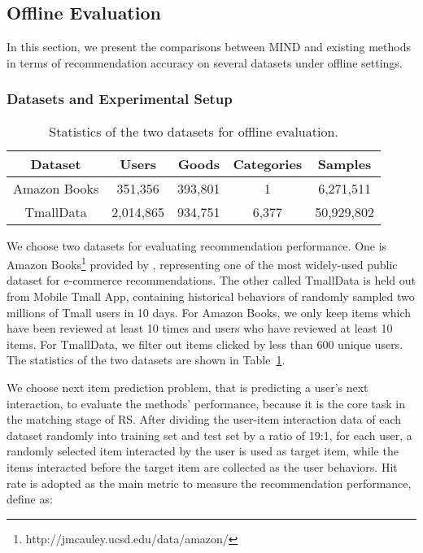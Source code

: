 \documentclass[sigconf]{acmart}
\begin{document}
\subsection{Offline Evaluation}
In this section, we present the comparisons between MIND and existing methods in terms of recommendation accuracy on several datasets under offline settings.

\subsubsection{Datasets and Experimental Setup}

\begin{table}[]
  \centering
  \caption{Statistics of the two datasets for offline evaluation.}
  \label{dataset:statistics}
  \begin{tabular}{ccccc}
    \toprule
    Dataset & Users & Goods & Categories & Samples \\ \hline
    Amazon Books & 351,356  & 393,801 & 1 & 6,271,511 \\ \hline
    TmallData & 2,014,865 & 934,751 & 6,377 & 50,929,802 \\ \bottomrule
  \end{tabular}
\end{table}

We choose two datasets for evaluating recommendation performance.
One is Amazon Books\footnote{http://jmcauley.ucsd.edu/data/amazon/} provided by \cite{he2016ups,mcauley2015image}, representing one of the most widely-used public dataset for e-commerce recommendations.
The other called TmallData is held out from Mobile Tmall App, containing historical behaviors of randomly sampled two millions of Tmall users in 10 days.
For Amazon Books, we only keep items which have been reviewed at least 10 times and users who have reviewed at least 10 items.
For TmallData, we filter out items clicked by less than 600 unique users.
The statistics of the two datasets are shown in Table~\ref{dataset:statistics}.

We choose next item prediction problem, that is predicting a user's next interaction, to evaluate the methods' performance, because it is the core task in the matching stage of RS.
After dividing the user-item interaction data of each dataset randomly into training set and test set by a ratio of 19:1, for each user, a randomly selected item interacted by the user is used as target item, while the items interacted before the target item are collected as the user behaviors.
Hit rate is adopted as the main metric to measure the recommendation performance, define as:
\end{document}
